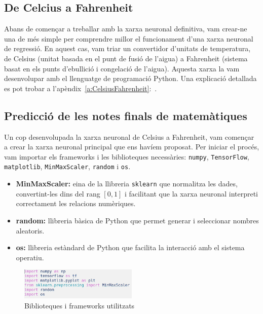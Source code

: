 \subsection{De Celcius a Fahrenheit}

Abans de començar a treballar amb la xarxa neuronal definitiva, vam crear-ne una de més simple per comprendre millor el funcionament d’una xarxa neuronal de regressió. En aquest cas, vam triar un convertidor d’unitats de temperatura, de Celsius (unitat basada en el punt de fusió de l’aigua) a Fahrenheit (sistema basat en els punts d’ebullició i congelació de l’aigua). Aquesta xarxa la vam desenvolupar amb el llenguatge de programació Python. Una explicació detallada es pot trobar a l’apèndix~\ref{a:CelsiusFahrenheit}:~.


\subsection{Predicció de les notes finals de matemàtiques}
Un cop desenvolupada la xarxa neuronal de Celsius a Fahrenheit, vam començar a crear la xarxa neuronal principal que ens havíem proposat. Per iniciar el procés, vam importar els frameworks i les biblioteques necessàries: \texttt{numpy}, \texttt{TensorFlow}, \texttt{matplotlib}, \texttt{MinMaxScaler}, \texttt{random} i \texttt{os}.

\begin{itemize}

\item \textbf{MinMaxScaler:} eina de la llibreria \texttt{sklearn} que normalitza les dades, convertint-les dins del rang $[0,1]$ i facilitant que la xarxa neuronal interpreti correctament les relacions numèriques.

\item \textbf{random:} llibreria bàsica de Python que permet generar i seleccionar nombres aleatoris.

\item \textbf{os:} llibreria estàndard de Python que facilita la interacció amb el sistema operatiu.

\end{itemize}

\begin{figure}[h!]
\centering
\includegraphics[width=0.5\textwidth]{./figures/21.png}
\caption{Biblioteques i frameworks utilitzats}
\end{figure}

